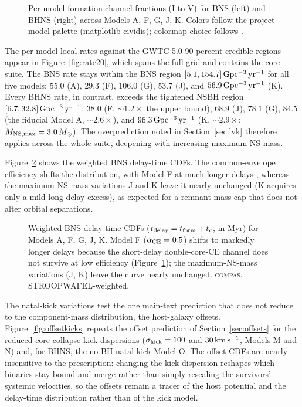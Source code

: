\documentclass[twocolumn,amsmath]{aastex702}
\newcommand{\Msun}{M_\odot}
\newcommand{\compas}{\textsc{compas}}
\newcommand{\Gpcyr}{{\rm Gpc^{-3}\,yr^{-1}}}
\begin{document}
\begin{figure}[tbp]
\caption{Per-model \citet{broekgaarden2021} formation-channel fractions (I to V)
for BNS (left) and BHNS (right) across Models A, F, G, J, K. Colors follow the
project model palette (matplotlib cividis); colormap choice follows
\citet{crameri2020}. \label{fig:chanfrac}}
\end{figure}

The per-model local rates against the GWTC-5.0 90 percent credible regions
\citep{abac2026} appear in Figure~\ref{fig:rate20}, which spans the full grid
and contains the core suite. The BNS rate stays within the BNS region
$[5.1, 154.7]\,\Gpcyr$ for all five models: $55.0$ (A), $29.3$ (F), $106.0$ (G),
$53.7$ (J), and $56.9\,\Gpcyr$ (K). Every BHNS rate, in contrast, exceeds the
tightened NSBH region $[6.7, 32.8]\,\Gpcyr$: $38.0$ (F, $\sim 1.2\times$ the
upper bound), $68.9$ (J), $78.1$ (G), $84.5$ (the fiducial Model A,
$\sim 2.6\times$), and $96.3\,\Gpcyr$ (K, $\sim 2.9\times$;
$M_{\rm NS,max} = 3.0\,\Msun$). The overprediction noted in
Section~\ref{sec:lvk} therefore applies across the whole suite, deepening with
increasing maximum NS mass.

Figure~\ref{fig:delaycdfmodel} shows the weighted BNS delay-time CDFs. The
common-envelope efficiency shifts the distribution, with Model F at much longer
delays \citep{vanson2022,broekgaarden2022}, whereas the maximum-NS-mass
variations J and K leave it nearly unchanged (K acquires only a mild
long-delay excess), as expected for a
remnant-mass cap that does not alter orbital separations.

\begin{figure}[tbp]
\caption{Weighted BNS delay-time CDFs ($t_{\rm delay} = t_{\rm form} + t_c$, in
Myr) for \citet{broekgaarden2021} Models A, F, G, J, K. Model F
($\alpha_{\rm CE} = 0.5$) shifts to markedly longer delays because the
short-delay double-core-CE channel does not survive at low efficiency
(Figure~\ref{fig:chanfrac}); the maximum-NS-mass
variations (J, K) leave the curve nearly unchanged. \compas,
STROOPWAFEL-weighted.
\label{fig:delaycdfmodel}}
\end{figure}

The natal-kick variations test the one main-text prediction that does not
reduce to the component-mass distribution, the host-galaxy offsets.
Figure~\ref{fig:offsetkicks} repeats the offset prediction of
Section~\ref{sec:offsets} for the reduced core-collapse kick dispersions
($\sigma_{\rm kick} = 100$ and $30\,{\rm km\,s^{-1}}$, Models M and N) and,
for BHNS, the no-BH-natal-kick Model O. The offset CDFs are nearly insensitive
to the prescription: changing the kick dispersion reshapes which binaries stay
bound and merge rather than simply rescaling the survivors' systemic
velocities, so the offsets remain a tracer of the host potential and the
delay-time distribution rather than of the kick model.
\end{document}
